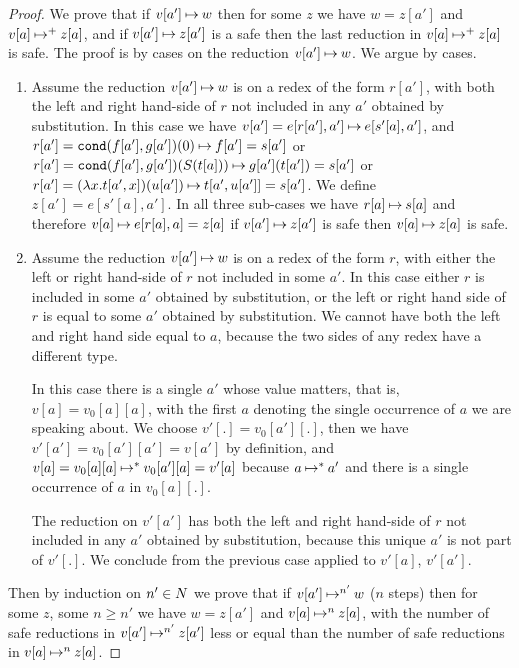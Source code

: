 \begin{proof}
We prove that if $v[a'] \mathbin{\mapsto} w$ then for some $z$ we have $w=z[a']$ and $v[a] \mathbin{\mapsto}^+ z[a]$,
and if $v[a'] \mathbin{\mapsto} z[a']$ is a safe then the last reduction in $v[a] \mathbin{\mapsto}^+ z[a]$ is safe.
The proof is by cases on the reduction $v[a'] \mathbin{\mapsto} w$.  We argue by cases.

\begin{enumerate}

\item
Assume the reduction $v[a'] \mathbin{\mapsto} w$ is on a redex of the form $r[a']$, with both the left
and right hand-side of $r$ not included in any $a'$ obtained by substitution. 
In this case we have $v[a'] = e[r[a'],a']
\mathbin{\mapsto} e[s'[a],a']$, and
$r[a'] = {\tt cond}(f[a'],g[a'])(0) \mathbin{\mapsto} f[a'] = s[a']$ or 
$r[a'] = {\tt cond}(f[a'],g[a'])(S(t[a])) \mathbin{\mapsto} g[a'](t[a']) = s[a']$
or $r[a'] = (\lambda x.t[a',x])(u[a']) \mathbin{\mapsto} t[a',u[a']] = s[a']$. 
We define $z[a'] = e[s'[a],a']$. 
In all three sub-cases we have $r[a] \mathbin{\mapsto} s[a]$ and therefore $v[a] \mathbin{\mapsto} e[r[a],a] = z[a]$
if $v[a'] \mathbin{\mapsto} z[a']$ is safe then $v[a] \mathbin{\mapsto} z[a]$ is safe.

\item
Assume the reduction $v[a'] \mathbin{\mapsto} w$ is on a redex of the form $r$, with either the left
or right hand-side of $r$ not included in some $a'$. In this case either $r$ is included in some $a'$ 
obtained by substitution, or the left or right hand side of $r$ is equal to some $a'$ obtained by substitution.
We cannot have both the left and right hand side equal to $a$, because the two sides of any redex 
have a different type.

In this case there is a single $a'$ whose value matters, that is, $v[a] = v_0[a][a]$, with the first $a$ denoting
the single occurrence of $a$ we are speaking about. We choose $v'[.] = v_0[a'][.]$, then we have
$v'[a']=v_0[a'][a']=v[a']$ by definition, and $v[a] = v_0[a][a] \mathbin{\mapsto}^* v_0[a'][a] = v'[a]$ 
because $a \mathbin{\mapsto}^* a'$ and there is a single occurrence of $a$ in $v_0[a][.]$. 

The reduction on $v'[a']$ has both the left
and right hand-side of $r$ not included in any $a'$ obtained by substitution, because this unique
$a'$ is not part of $v'[.]$. We conclude from the previous case applied to $v'[a]$, $v'[a']$.

\end{enumerate}
Then by induction on $n' \in {N}$ we prove that if $v[a'] \mathbin{\mapsto}^{n'} w$ ($n$ steps) 
then for some $z$, some $n \ge n'$ we have $w=z[a']$ and $v[a] \mathbin{\mapsto}^{n} z[a]$,
with the number of safe reductions in  $v[a'] \mathbin{\mapsto}^{n'} z[a']$ less or equal than the number
of safe reductions in $v[a] \mathbin{\mapsto}^{n} z[a]$.

\end{proof}

